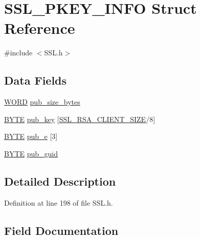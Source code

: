 \hypertarget{struct_s_s_l___p_k_e_y___i_n_f_o}{}\section{S\+S\+L\+\_\+\+P\+K\+E\+Y\+\_\+\+I\+N\+F\+O Struct Reference}
\label{struct_s_s_l___p_k_e_y___i_n_f_o}


{\ttfamily \#include $<$S\+S\+L.\+h$>$}

\subsection*{Data Fields}
\begin{DoxyCompactItemize}
\item 
\hyperlink{_generic_type_defs_8h_a2b0e863dadf920709ec53d9088ee7c91}{W\+O\+R\+D} \hyperlink{struct_s_s_l___p_k_e_y___i_n_f_o_aa836f00b86e5af09e5ab2362794d787c}{pub\+\_\+size\+\_\+bytes}
\item 
\hyperlink{_generic_type_defs_8h_a4ae1dab0fb4b072a66584546209e7d58}{B\+Y\+T\+E} \hyperlink{struct_s_s_l___p_k_e_y___i_n_f_o_a3bfdbc645929212c40236e6652e139dc}{pub\+\_\+key} \mbox{[}\hyperlink{_s_s_l_client_size_8h_a1a30802efbae822f43c0fa208ceea87c}{S\+S\+L\+\_\+\+R\+S\+A\+\_\+\+C\+L\+I\+E\+N\+T\+\_\+\+S\+I\+Z\+E}/8\mbox{]}
\item 
\hyperlink{_generic_type_defs_8h_a4ae1dab0fb4b072a66584546209e7d58}{B\+Y\+T\+E} \hyperlink{struct_s_s_l___p_k_e_y___i_n_f_o_abbbd47d9225209be9b36104fba835f3f}{pub\+\_\+e} \mbox{[}3\mbox{]}
\item 
\hyperlink{_generic_type_defs_8h_a4ae1dab0fb4b072a66584546209e7d58}{B\+Y\+T\+E} \hyperlink{struct_s_s_l___p_k_e_y___i_n_f_o_a648142c984b76eddbad388a1275956d2}{pub\+\_\+guid}
\end{DoxyCompactItemize}


\subsection{Detailed Description}


Definition at line 198 of file S\+S\+L.\+h.



\subsection{Field Documentation}
\hypertarget{struct_s_s_l___p_k_e_y___i_n_f_o_abbbd47d9225209be9b36104fba835f3f}{}
